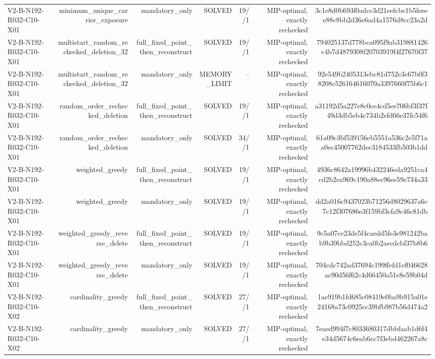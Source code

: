{\begin{longtable}{lrrrrrr}
V2-B-N192-R032-C10-X01 & minimum\_unique\_carrier\_exposure & mandatory\_only & SOLVED & 19//1 & MIP-optimal, exactly rechecked & 3c1e8d0b693f0adcc3d21eefcbe1b5feeee88c8bb2d36e6ad4a1576d8cc23a2d \\
V2-B-N192-R032-C10-X01 & multistart\_random\_rechecked\_deletion\_32 & full\_fixed\_point\_then\_reconstruct & SOLVED & 19//1 & MIP-optimal, exactly rechecked & 794025137d778bca095f9ab319881426c4b7d4879308f20703919f4f27670f37 \\
V2-B-N192-R032-C10-X01 & multistart\_random\_rechecked\_deletion\_32 & mandatory\_only & MEMORY\_LIMIT & -- & MIP-optimal, exactly rechecked & 92e549b2405313ebc81d752c3c67b0f38208c526164616070a3397660f75b6c1 \\
V2-B-N192-R032-C10-X01 & random\_order\_rechecked\_deletion & full\_fixed\_point\_then\_reconstruct & SOLVED & 19//1 & MIP-optimal, exactly rechecked & a31192d5a227e8c0ce4cd5ee706bf3f37f49d3db5eb4c734b2efd66e37fc54f6 \\
V2-B-N192-R032-C10-X01 & random\_order\_rechecked\_deletion & mandatory\_only & SOLVED & 34//1 & MIP-optimal, exactly rechecked & 61a09c3bf539156eb5551a536c2e5f71aa0ec45007762dec3184533fb503b1dd \\
V2-B-N192-R032-C10-X01 & weighted\_greedy & full\_fixed\_point\_then\_reconstruct & SOLVED & 19//1 & MIP-optimal, exactly rechecked & 4936c8642a19996b432246eda9251ca4cd2b2ea969c190a88ec96ee59e734a33 \\
V2-B-N192-R032-C10-X01 & weighted\_greedy & mandatory\_only & SOLVED & 19//1 & MIP-optimal, exactly rechecked & dd2a016c9437023b71256d8029637a6c7c12f307686e3f159bf3cfa9c46c81db \\
V2-B-N192-R032-C10-X01 & weighted\_greedy\_reverse\_delete & full\_fixed\_point\_then\_reconstruct & SOLVED & 19//1 & MIP-optimal, exactly rechecked & 9c5a07ce23de5f4caedd5fe3e981242bab9b39bbd252c3ca0b2aecdcbf37b8b6 \\
V2-B-N192-R032-C10-X01 & weighted\_greedy\_reverse\_delete & mandatory\_only & SOLVED & 19//1 & MIP-optimal, exactly rechecked & 704cdc742ad37694c199ffefd1ef046628ac90d56f62c4d66450a51e8e59b04d \\
V2-B-N192-R032-C10-X02 & cardinality\_greedy & full\_fixed\_point\_then\_reconstruct & SOLVED & 27//1 & MIP-optimal, exactly rechecked & 1ae919b1fd685c08419e0ba9b915a01e24168a73c0925cc39bfb987b56d474a2 \\
V2-B-N192-R032-C10-X02 & cardinality\_greedy & mandatory\_only & SOLVED & 27//1 & MIP-optimal, exactly rechecked & 7eaed994f7c8033680317dbbfaab1d6f4e34d5674c6eab6cc7f3ebd462267a8c \\

\end{longtable}}
